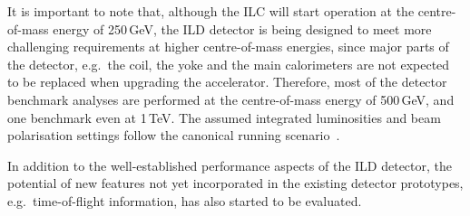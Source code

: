 It is important to note that, although the ILC will start operation at the centre-of-mass energy of 250\,GeV, the ILD detector is being designed to meet more challenging requirements at higher centre-of-mass energies, since major parts of the detector, e.g.\ the coil, the yoke and the main calorimeters are not expected to be replaced when upgrading the accelerator. Therefore, most of the detector benchmark analyses are performed at the centre-of-mass energy of 500\,GeV, and one benchmark even at 1\,TeV. The assumed integrated luminosities and beam polarisation settings follow the canonical running scenario~\cite{Barklow:2015tja}.

In addition to the well-established performance aspects of the ILD detector, the potential of new features not yet incorporated in the existing detector prototypes, e.g.\ time-of-flight information, has also started to be evaluated.

